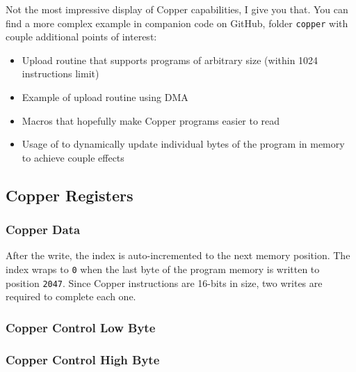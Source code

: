 Not the most impressive display of Copper capabilities, I give you that. You can find a more complex example in companion code on GitHub, folder {\tt copper} with couple additional points of interest:

\begin{itemize}[topsep=1pt,itemsep=1pt]
	\item Upload routine that supports programs of arbitrary size (within 1024 instructions limit)
	\item Example of upload routine using DMA
	\item Macros that hopefully make Copper programs easier to read
	\item Usage of  to dynamically update individual bytes of the program in memory to achieve couple effects
\end{itemize}


\pagebreak
\subsection{Copper Registers}
\label{zx_next_copper_registers}


\subsubsection{Copper Data }

\begin{NextPort}
\end{NextPort}

After the write, the index is auto-incremented to the next memory position. The index wraps to {\tt 0} when the last byte of the program memory is written to position {\tt 2047}. Since Copper instructions are 16-bits in size, two writes are required to complete each one.


\subsubsection{Copper Control Low Byte }

\begin{NextPort}
\end{NextPort}


\subsubsection{Copper Control High Byte }

